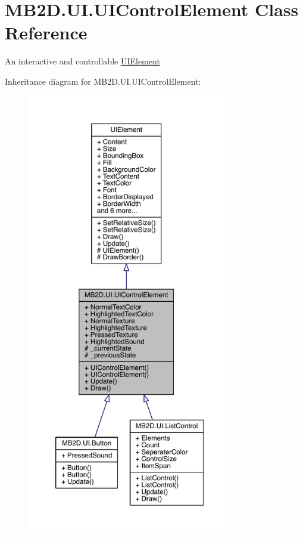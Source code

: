 \hypertarget{class_m_b2_d_1_1_u_i_1_1_u_i_control_element}{}\section{M\+B2\+D.\+U\+I.\+U\+I\+Control\+Element Class Reference}
\label{class_m_b2_d_1_1_u_i_1_1_u_i_control_element}


An interactive and controllable \hyperlink{class_m_b2_d_1_1_u_i_1_1_u_i_element}{U\+I\+Element}  




Inheritance diagram for M\+B2\+D.\+U\+I.\+U\+I\+Control\+Element\+:\nopagebreak
\begin{figure}[H]
\begin{center}
\leavevmode
\includegraphics[height=550pt]{class_m_b2_d_1_1_u_i_1_1_u_i_control_element__inherit__graph}
\end{center}
\end{figure}


